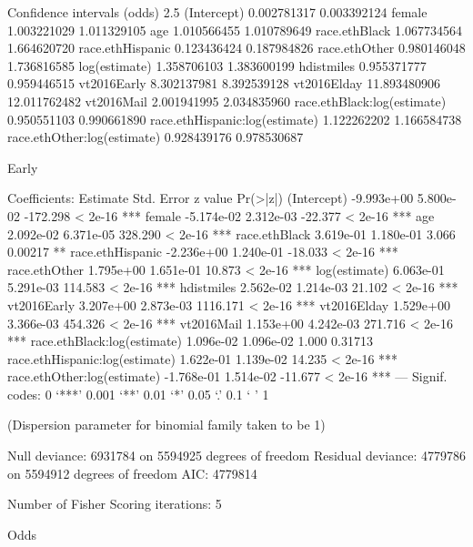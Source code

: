 Confidence intervals (odds)
2.5 %
(Intercept)                     0.002781317  0.003392124
female                          1.003221029  1.011329105
age                             1.010566455  1.010789649
race.ethBlack                   1.067734564  1.664620720
race.ethHispanic                0.123436424  0.187984826
race.ethOther                   0.980146048  1.736816585
log(estimate)                   1.358706103  1.383600199
hdistmiles                      0.955371777  0.959446515
vt2016Early                     8.302137981  8.392539128
vt2016Elday                    11.893480906 12.011762482
vt2016Mail                      2.001941995  2.034835960
race.ethBlack:log(estimate)     0.950551103  0.990661890
race.ethHispanic:log(estimate)  1.122262202  1.166584738
race.ethOther:log(estimate)     0.928439176  0.978530687



Early

Coefficients:
                                 Estimate Std. Error  z value Pr(>|z|)
(Intercept)                    -9.993e+00  5.800e-02 -172.298  < 2e-16 ***
female                         -5.174e-02  2.312e-03  -22.377  < 2e-16 ***
age                             2.092e-02  6.371e-05  328.290  < 2e-16 ***
race.ethBlack                   3.619e-01  1.180e-01    3.066  0.00217 **
race.ethHispanic               -2.236e+00  1.240e-01  -18.033  < 2e-16 ***
race.ethOther                   1.795e+00  1.651e-01   10.873  < 2e-16 ***
log(estimate)                   6.063e-01  5.291e-03  114.583  < 2e-16 ***
hdistmiles                      2.562e-02  1.214e-03   21.102  < 2e-16 ***
vt2016Early                     3.207e+00  2.873e-03 1116.171  < 2e-16 ***
vt2016Elday                     1.529e+00  3.366e-03  454.326  < 2e-16 ***
vt2016Mail                      1.153e+00  4.242e-03  271.716  < 2e-16 ***
race.ethBlack:log(estimate)     1.096e-02  1.096e-02    1.000  0.31713
race.ethHispanic:log(estimate)  1.622e-01  1.139e-02   14.235  < 2e-16 ***
race.ethOther:log(estimate)    -1.768e-01  1.514e-02  -11.677  < 2e-16 ***
---
Signif. codes:  0 ‘***’ 0.001 ‘**’ 0.01 ‘*’ 0.05 ‘.’ 0.1 ‘ ’ 1

(Dispersion parameter for binomial family taken to be 1)

    Null deviance: 6931784  on 5594925  degrees of freedom
Residual deviance: 4779786  on 5594912  degrees of freedom
AIC: 4779814

Number of Fisher Scoring iterations: 5

Odds

